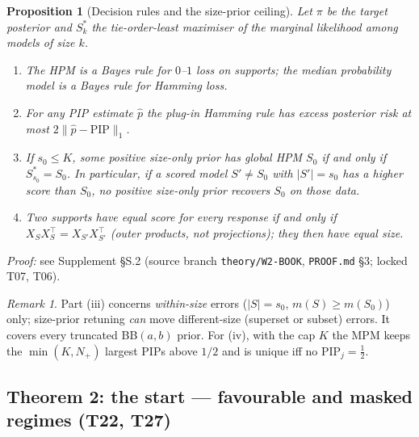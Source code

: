 \documentclass[11pt]{article}
\newtheorem{proposition}{Proposition}
\theoremstyle{definition}
\theoremstyle{remark}
\newtheorem{remark}{Remark}
\newcommand{\Sz}{S_0}
\newcommand{\PIP}{\mathrm{PIP}}
\begin{document}
\begin{proposition}[Decision rules and the size-prior ceiling]\label{prop:decision}
Let $\pi$ be the target posterior and $S^*_k$ the tie-order-least maximiser of the marginal likelihood among
models of size $k$.
\begin{enumerate}
\item[(i)] The HPM is a Bayes rule for $0$--$1$ loss on supports; the median probability model is a Bayes rule for Hamming loss.
\item[(ii)] For any PIP estimate $\hat p$ the plug-in Hamming rule has excess posterior risk at most $2\|\hat p-\PIP\|_1$.
\item[(iii)] If $s_0\le K$, some positive size-only prior has global HPM $\Sz$ if and only if $S^*_{s_0}=\Sz$.
In particular, if a scored model $S'\ne\Sz$ with $|S'|=s_0$ has a higher score than $\Sz$, no positive size-only prior
recovers $\Sz$ on those data.
\item[(iv)] Two supports have equal score for every response if and only if $X_SX_S^\top=X_{S'}X_{S'}^\top$ (outer
products, not projections); they then have equal size.
\end{enumerate}
\end{proposition}
\noindent\emph{Proof:} see Supplement \S S.2 (source branch \texttt{theory/W2-BOOK}, \texttt{PROOF.md} \S3; locked T07, T06).

\begin{remark}\label{rem:ceiling}
Part (iii) concerns \emph{within-size} errors ($|S|=s_0$, $m(S)\ge m(\Sz)$) only; size-prior retuning \emph{can} move
different-size (superset or subset) errors. It covers every truncated BB$(a,b)$ prior. For (iv), with the cap $K$ the
MPM keeps the $\min(K,N_+)$ largest PIPs above $1/2$ and is unique iff no $\PIP_j=\tfrac12$.
\end{remark}

\subsection{Theorem 2: the start --- favourable and masked regimes (T22, T27)}
\end{document}
